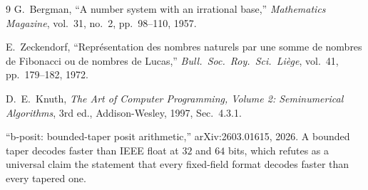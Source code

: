 \documentclass[11pt]{article}
\theoremstyle{definition}
\begin{document}
\begin{thebibliography}{9}
 G.~Bergman, ``A number system with an irrational base,''
\emph{Mathematics Magazine}, vol.~31, no.~2, pp.~98--110, 1957.

 E.~Zeckendorf, ``Repr\'esentation des nombres naturels
par une somme de nombres de Fibonacci ou de nombres de Lucas,'' \emph{Bull.\
Soc.\ Roy.\ Sci.\ Li\`ege}, vol.~41, pp.~179--182, 1972.

 D.~E.~Knuth, \emph{The Art of Computer Programming, Volume 2:
Seminumerical Algorithms}, 3rd ed., Addison-Wesley, 1997, Sec.~4.3.1.

 ``b-posit: bounded-taper posit arithmetic,'' arXiv:2603.01615,
2026. A bounded taper decodes faster than IEEE float at $32$ and $64$ bits, which
refutes as a universal claim the statement that every fixed-field format decodes
faster than every tapered one.

\end{thebibliography}
\end{document}
